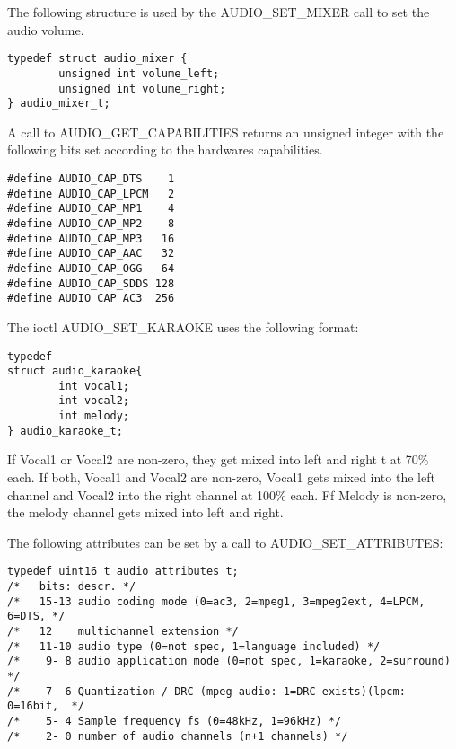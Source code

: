 \label{audiomixer}
The following structure is used by the AUDIO\_SET\_MIXER call to set
the audio volume.
\begin{verbatim}
typedef struct audio_mixer { 
        unsigned int volume_left;
        unsigned int volume_right;
} audio_mixer_t;
\end{verbatim}

\label{audiotypes}
A call to AUDIO\_GET\_CAPABILITIES returns an unsigned integer with
the following bits set according to the hardwares capabilities.
\begin{verbatim}
#define AUDIO_CAP_DTS    1
#define AUDIO_CAP_LPCM   2
#define AUDIO_CAP_MP1    4
#define AUDIO_CAP_MP2    8
#define AUDIO_CAP_MP3   16
#define AUDIO_CAP_AAC   32
#define AUDIO_CAP_OGG   64
#define AUDIO_CAP_SDDS 128
#define AUDIO_CAP_AC3  256
\end{verbatim}


\label{audiokaraoke}
The ioctl AUDIO\_SET\_KARAOKE uses the following format:
\begin{verbatim}
typedef
struct audio_karaoke{
        int vocal1;  
        int vocal2;  
        int melody;  
} audio_karaoke_t;
\end{verbatim}

If Vocal1 or Vocal2 are non-zero, they get mixed
into left and right t at 70\% each.
If both, Vocal1 and Vocal2 are non-zero, Vocal1 gets
mixed into the left channel and
Vocal2 into the right channel at 100\% each.
Ff Melody is non-zero, the melody channel gets mixed
into left and right.

\label{aattrib}
The following attributes can be set by a call to AUDIO\_SET\_ATTRIBUTES:
\begin{verbatim}
typedef uint16_t audio_attributes_t;
/*   bits: descr. */
/*   15-13 audio coding mode (0=ac3, 2=mpeg1, 3=mpeg2ext, 4=LPCM, 6=DTS, */
/*   12    multichannel extension */
/*   11-10 audio type (0=not spec, 1=language included) */
/*    9- 8 audio application mode (0=not spec, 1=karaoke, 2=surround) */
/*    7- 6 Quantization / DRC (mpeg audio: 1=DRC exists)(lpcm: 0=16bit,  */
/*    5- 4 Sample frequency fs (0=48kHz, 1=96kHz) */
/*    2- 0 number of audio channels (n+1 channels) */
\end{verbatim}


\clearpage


